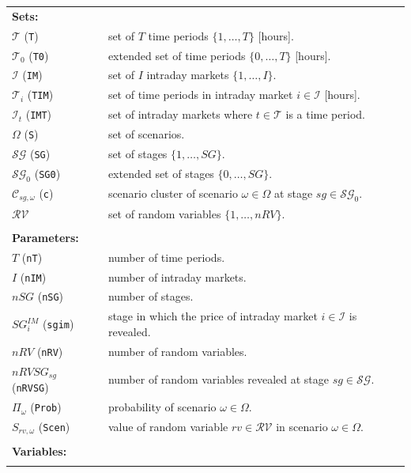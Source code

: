 \documentclass{article}
\begin{document}
\begin{tabularx}{\textwidth}{l l}
    \textbf{Sets:} \\
    $\mathcal{T}$ (\verb|T|) & set of $T$ time periods $\{ 1, \dots, T \}$ [hours]. \\
	$\mathcal{T}_0$ (\verb|T0|) & extended set of time periods $\{ 0, \dots, T \}$ [hours]. \\     
	$\mathcal{I}$ (\verb|IM|) & set of $I$ intraday markets $\{1, \dots, I \}$. \\    
    $\mathcal{T}_i$ (\verb|TIM|) & set of time periods in intraday market $i \in \mathcal{I}$ [hours]. \\
	$\mathcal{I}_t$ (\verb|IMT|) & set of intraday markets where $t \in \mathcal{T}$ is a time period. \\    
	$\Omega$ (\verb|S|) & set of scenarios. \\
	$\mathcal{SG}$ (\verb|SG|) & set of stages $\{1, \dots, SG \}$. \\
	$\mathcal{SG}_0$ (\verb|SG0|) & extended set of stages $\{0, \dots, SG \}$. \\     
    $\mathcal{C}_{sg, \omega}$ (\verb|c|) & scenario cluster of scenario $\omega \in \Omega$ at stage $sg \in \mathcal{SG}_0$. \\
    $\mathcal{RV}$ & set of random variables $\{1, \dots, nRV \}$. \\
    \\
   
    
    \textbf{Parameters:} \\
	$T$ (\verb|nT|) & number of time periods. \\
	$I$ (\verb|nIM|) & number of intraday markets. \\
	$nSG$ (\verb|nSG|) & number of stages. \\
	$SG^{IM}_i$ (\verb|sgim|) & stage in which the price of intraday market $i \in \mathcal{I}$ is revealed. \\
	$nRV$ (\verb|nRV|) & number of random variables. \\
	$nRVSG_{sg}$ (\verb|nRVSG|) & number of random variables revealed at stage $sg \in \mathcal{SG}$. \\
	$\Pi_{\omega}$ (\verb|Prob|) & probability of scenario $\omega \in \Omega$. \\
	$S_{rv, \omega}$ (\verb|Scen|) & value of random variable $rv \in \mathcal{RV}$ in scenario $\omega \in \Omega$. \\    
    \\
       
    \textbf{Variables:} \\
	\\
\end{tabularx}
\end{document}
